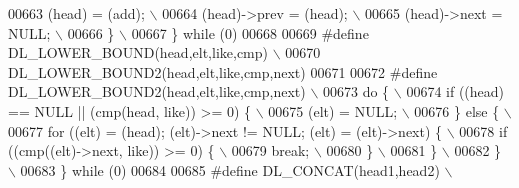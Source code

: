 \begin{DoxyCode}
00663 \textcolor{preprocessor}{    (head) = (add);                                                                            \(\backslash\)}
00664 \textcolor{preprocessor}{    (head)->prev = (head);                                                                     \(\backslash\)}
00665 \textcolor{preprocessor}{    (head)->next = NULL;                                                                       \(\backslash\)}
00666 \textcolor{preprocessor}{  \}                                                                                            \(\backslash\)}
00667 \textcolor{preprocessor}{\} while (0)}
00668 
00669 \textcolor{preprocessor}{#define DL\_LOWER\_BOUND(head,elt,like,cmp)                                                      \(\backslash\)}
00670 \textcolor{preprocessor}{    DL\_LOWER\_BOUND2(head,elt,like,cmp,next)}
00671 
00672 \textcolor{preprocessor}{#define DL\_LOWER\_BOUND2(head,elt,like,cmp,next)                                                \(\backslash\)}
00673 \textcolor{preprocessor}{do \{                                                                                           \(\backslash\)}
00674 \textcolor{preprocessor}{  if ((head) == NULL || (cmp(head, like)) >= 0) \{                                              \(\backslash\)}
00675 \textcolor{preprocessor}{    (elt) = NULL;                                                                              \(\backslash\)}
00676 \textcolor{preprocessor}{  \} else \{                                                                                     \(\backslash\)}
00677 \textcolor{preprocessor}{    for ((elt) = (head); (elt)->next != NULL; (elt) = (elt)->next) \{                           \(\backslash\)}
00678 \textcolor{preprocessor}{      if ((cmp((elt)->next, like)) >= 0) \{                                                     \(\backslash\)}
00679 \textcolor{preprocessor}{        break;                                                                                 \(\backslash\)}
00680 \textcolor{preprocessor}{      \}                                                                                        \(\backslash\)}
00681 \textcolor{preprocessor}{    \}                                                                                          \(\backslash\)}
00682 \textcolor{preprocessor}{  \}                                                                                            \(\backslash\)}
00683 \textcolor{preprocessor}{\} while (0)}
00684 
00685 \textcolor{preprocessor}{#define DL\_CONCAT(head1,head2)                                                                 \(\backslash\)}

\end{DoxyCode}
